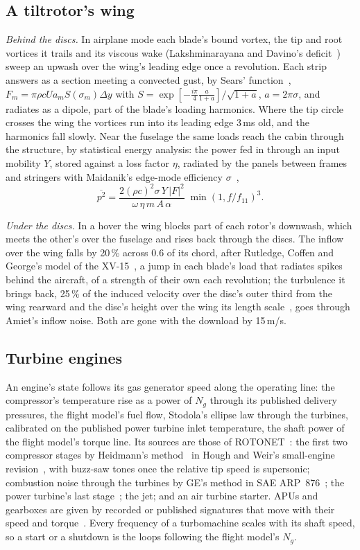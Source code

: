 \documentclass[10pt,a4paper,twocolumn]{article}
\begin{document}
\subsection{A tiltrotor's wing}
\emph{Behind the discs.} In airplane mode each blade's bound vortex, the tip and root vortices it trails and its viscous wake (Lakshminarayana and Davino's deficit~\cite{lak}) sweep an upwash over the wing's leading edge once a revolution. Each strip answers as a section meeting a convected gust, by Sears' function~\cite{sears}, $F_m=\pi\rho c U a_m S(\sigma_m)\Delta y$ with $S=\exp[-\frac{i\pi}{4}\frac{a}{1+a}]/\sqrt{1+a}$, $a=2\pi\sigma$, and radiates as a dipole, part of the blade's loading harmonics. Where the tip circle crosses the wing the vortices run into its leading edge 3\,ms old, and the harmonics fall slowly. Near the fuselage the same loads reach the cabin through the structure, by statistical energy analysis: the power fed in through an input mobility $Y$, stored against a loss factor $\eta$, radiated by the panels between frames and stringers with Maidanik's edge-mode efficiency $\sigma$~\cite{maidanik},
\begin{equation}
\overline{p^2} = \frac{2(\rho c)^2\sigma\,Y\,|F|^2}{\omega\,\eta\,m\,A\,\alpha}\;\min(1,f/f_{11})^3 .
\end{equation}

\emph{Under the discs.} In a hover the wing blocks part of each rotor's downwash, which meets the other's over the fuselage and rises back through the discs. The inflow over the wing falls by 20\,\% across 0.6 of its chord, after Rutledge, Coffen and George's model of the XV-15~\cite{rcg}, a jump in each blade's load that radiates spikes behind the aircraft, of a strength of their own each revolution; the turbulence it brings back, 25\,\% of the induced velocity over the disc's outer third from the wing rearward and the disc's height over the wing its length scale~\cite{george}, goes through Amiet's inflow noise. Both are gone with the download by 15\,m/s.

\subsection{Turbine engines}
An engine's state follows its gas generator speed along the operating line: the compressor's temperature rise as a power of $N_g$ through its published delivery pressures, the flight model's fuel flow, Stodola's ellipse law through the turbines, calibrated on the published power turbine inlet temperature, the shaft power of the flight model's torque line. Its sources are those of ROTONET~\cite{anopp}: the first two compressor stages by Heidmann's method~\cite{heidmann} in Hough and Weir's small-engine revision~\cite{hough}, with buzz-saw tones once the relative tip speed is supersonic; combustion noise through the turbines by GE's method in SAE ARP~876~\cite{arp876}; the power turbine's last stage~\cite{ge77}; the jet; and an air turbine starter. APUs and gearboxes are given by recorded or published signatures that move with their speed and torque~\cite{review}. Every frequency of a turbomachine scales with its shaft speed, so a start or a shutdown is the loops following the flight model's $N_g$.
\end{document}
